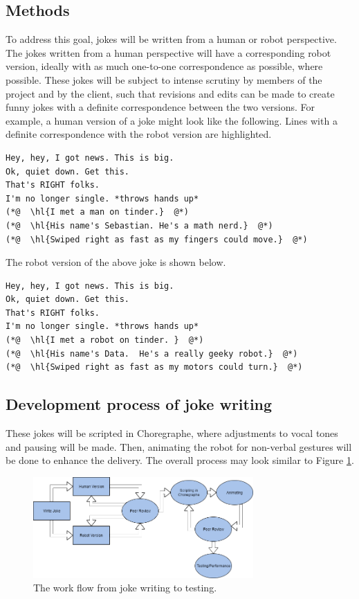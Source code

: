 \documentclass[onecolumn, draftclsnofoot,10pt, compsoc]{IEEEtran}
\begin{document}
\subsection{Methods}
To address this goal, jokes will be written from a human or robot perspective.
The jokes written from a human perspective will have a corresponding robot version, ideally with as much one-to-one correspondence as possible, where possible.
These jokes will be subject to intense scrutiny by members of the project and by the client, such that revisions and edits can be made to create funny jokes with a definite correspondence between the two versions.
For example, a human version of a joke might look like the following. Lines with a definite correspondence with the robot version are highlighted.

\begin{lstlisting}
Hey, hey, I got news. This is big.
Ok, quiet down. Get this.
That's RIGHT folks.
I'm no longer single. *throws hands up*
(*@  \hl{I met a man on tinder.}  @*)
(*@  \hl{His name's Sebastian. He's a math nerd.}  @*)
(*@  \hl{Swiped right as fast as my fingers could move.}  @*)
\end{lstlisting}

The robot version of the above joke is shown below.

\begin{lstlisting}
Hey, hey, I got news. This is big.
Ok, quiet down. Get this.
That's RIGHT folks.
I'm no longer single. *throws hands up*
(*@  \hl{I met a robot on tinder. }  @*)
(*@  \hl{His name's Data.  He's a really geeky robot.}  @*)
(*@  \hl{Swiped right as fast as my motors could turn.}  @*)
\end{lstlisting}

\subsection{Development process of joke writing}
These jokes will be scripted in Choregraphe, where adjustments to vocal tones and pausing will be made.
Then, animating the robot for non-verbal gestures will be done to enhance the delivery.
The overall process may look similar to Figure \ref{fig:write_process}.

\begin{figure}[H]
  \centering
  \includegraphics[width=0.75\textwidth,height=0.75\textheight,keepaspectratio]{joke_writing_process}
  \caption{The work flow from joke writing to testing.}
	\label{fig:write_process}
\end{figure}
\end{document}

